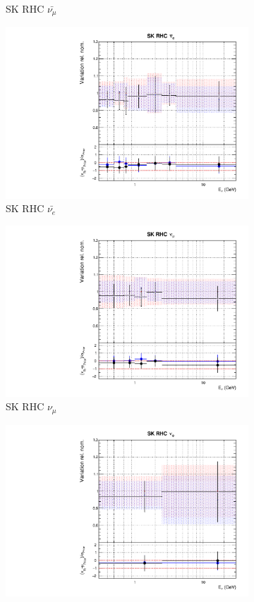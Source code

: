 \begin{figure}[t]
\begin{subfigure}{0.24\textwidth}
  \caption{SK RHC $\bar{\nu_{\mu}}$}
  \label{fig:}
\end{subfigure}
\begin{subfigure}{0.24\textwidth}
  \centering
  \includegraphics[width=0.95\linewidth]{figs/rhcmpasmvflux13}
  \caption{SK RHC $\bar{\nu_e}$}
  \label{fig:}
\end{subfigure}
\begin{subfigure}{0.24\textwidth}
  \centering
  \includegraphics[width=0.95\linewidth]{figs/rhcmpasmvflux14}
  \caption{SK RHC $\nu_{\mu}$}
  \label{fig:}
\end{subfigure}
\begin{subfigure}{0.24\textwidth}
  \centering
  \includegraphics[width=0.95\linewidth]{figs/rhcmpasmvflux15}

\end{subfigure}
\end{figure}

